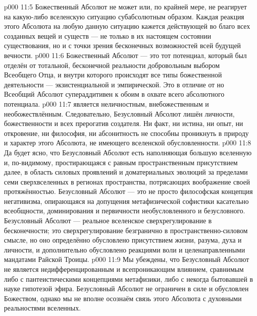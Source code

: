 \vs p000 11:5 Божественный Абсолют не может или, по крайней мере, не реагирует на какую\hyp{}либо вселенскую ситуацию субабсолютным образом. Каждая реакция этого Абсолюта на любую данную ситуацию кажется действующей во благо всех созданных вещей и существ --- не только в их настоящем состоянии существования, но и с точки зрения бесконечных возможностей всей будущей вечности.
\vs p000 11:6 Божественный Абсолют --- это тот потенциал, который был отделён от тотальной, бесконечной реальности добровольным выбором Всеобщего Отца, и внутри которого происходят все типы божественной деятельности --- экзистенциальной и эмпирической. Это  в отличие от  но Всеобщий Абсолют супераддитивен к обоим в охвате всего абсолютного потенциала.
\vs p000 11:7 \pc {} является неличностным, внебожественным и необожествлённым. Следовательно, Безусловный Абсолют лишён личности, божественности и всех прерогатив создателя. Ни факт, ни истина, ни опыт, ни откровение, ни философия, ни абсонитность не способны проникнуть в природу и характер этого Абсолюта, не имеющего вселенской обусловленности.
\vs p000 11:8 Да будет ясно, что Безусловный Абсолют есть  наполняющая большую вселенную и, по\hyp{}видимому, простирающаяся с равным пространственным присутствием далее, в область силовых проявлений и доматериальных эволюций за пределами семи сверхвселенных в регионах пространства, потрясающих воображение своей протяжённостью. Безусловный Абсолют --- это не просто философская концепция негативизма, опирающаяся на допущения метафизической софистики касательно всеобщности, доминирования и первичности необусловленного и безусловного. Безусловный Абсолют --- реальное вселенское сверхрегулирование в бесконечности; это сверхрегулирование безгранично в пространственно\hyp{}силовом смысле, но оно определённо обусловлено присутствием жизни, разума, духа и личности, и дополнительно обусловлено реакциями воли и целенаправленными мандатами Райской Троицы.
\vs p000 11:9 Мы убеждены, что Безусловный Абсолют не является недифференцированным и всепроникающим влиянием, сравнимым либо с пантеистическими концепциями метафизики, либо с некогда бытовавшей в науке гипотезой эфира. Безусловный Абсолют не ограничен в силе и обусловлен Божеством, однако мы не вполне осознаём связь этого Абсолюта с духовными реальностями вселенных.
